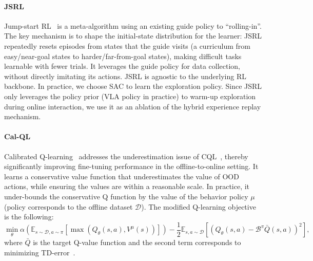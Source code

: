 \paragraph{JSRL}
Jump-start RL~\citep{JSRL} is a meta-algorithm using an existing guide policy to “rolling-in”. The key mechanism is to shape the initial-state distribution for the learner: JSRL repeatedly resets episodes from states that the guide visits (a curriculum from easy/near-goal states to harder/far-from-goal states), making difficult tasks learnable with fewer trials. It leverages the guide policy for data collection, without directly imitating its actions. JSRL is agnostic to the underlying RL backbone. In practice, we choose SAC to learn the exploration policy. Since JSRL only leverages the policy prior (VLA policy in practice) to warm-up exploration during online interaction, we use it as an ablation of the hybrid experience replay mechanism. 

\paragraph{Cal-QL}
Calibrated Q-learning~\citep{cal-QL} addresses the underestimation issue of CQL~\citep{CQL}, thereby significantly improving fine-tuning performance in the offline-to-online setting. It learns a conservative value function that underestimates the value of OOD actions, while ensuring the values are within a reasonable scale. In practice, it under-bounds the conservative Q function by the value of the behavior policy $\mu$ (policy corresponds to the offline dataset $\mathcal{D}$). The modified Q-learning objective is the following:
\[
    \min_{\theta} \alpha \left( \mathbb{E}_{s\sim \mathcal{D}, a \sim \pi}[\max(Q_\theta (s, a), V^\mu(s))] \right) - \frac{1}{2} \mathbb{E}_{s, a \sim \mathcal{D}} \left[ (Q_\theta(s, a) - \mathcal{B}^\pi \bar{Q}(s, a))^2 \right],
\]
where $\bar{Q}$ is the target Q-value function and the second term corresponds to minimizing TD-error~\cite{lillicrap2015continuous}. 


